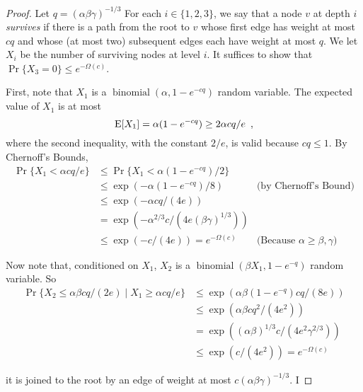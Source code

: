 \documentclass{patmorin}
\DeclareMathOperator{\binomial}{binomial}
\begin{document}
\begin{proof}
   Let $q=(\alpha\beta\gamma)^{-1/3}$
   For each $i\in\{1,2,3\}$, we say that a node $v$ at depth $i$
   \emph{survives} if there is a path from the root to $v$ whose
   first edge has weight at most $cq$
   and whose (at most two) subsequent edges each have weight at
   most $q$.  We let $X_i$ be the number of
   surviving nodes at level $i$.  It suffices to show that $\Pr\{X_3 =
   0\} \le e^{-\Omega(c)}$.

   First, note that $X_1$ is a $\binomial(\alpha, 1-e^{-cq})$ random variable.
   The expected value of $X_1$ is at most
   \[
       \mathrm{E}[X_1] = \alpha(1-e^{-cq}) \ge 2\alpha cq/e \enspace ,
   \]
   where the second inequality, with the constant $2/e$, is valid because
   $cq\le 1$.
   By Chernoff's Bounds,
   \begin{align*}
     \Pr\{X_1 < \alpha cq/e\} 
       & \le \Pr\{X_1 < \alpha(1-e^{-cq})/2\} \\
       & \le \exp\left(-\alpha(1-e^{-cq})/8\right) & \text{(by Chernoff's Bound)}\\
       & \le \exp\left(-\alpha cq/(4e)\right) & \text{}\\
       & = \exp\left(-\alpha^{2/3}c/\left(4e(\beta\gamma)^{1/3}\right)\right) \\
       & \le \exp\left(-c/(4e)\right) = e^{-\Omega(c)} & \text{(Because $\alpha \ge \beta,\gamma$)}
   \end{align*}

   Now note that, conditioned on $X_1$, $X_2$ is a
   $\binomial(\beta X_1,1-e^{-q})$ random variable.  So
   \begin{align*}
     \Pr\{X_2 \le \alpha\beta cq/(2e) \mid X_1 \ge \alpha cq/e\}
       & \le \exp\left(\alpha\beta (1-e^{-q}) cq/(8e)\right) \\
       & \le \exp\left(\alpha\beta cq^2/(4e^2)\right) \\
       & = \exp\left((\alpha\beta)^{1/3} c/(4e^2\gamma^{2/3})\right) \\
       & \le \exp\left(c/(4e^2)\right) = e^{-\Omega(c)}
   \end{align*}
 
it is joined to the
   root by an edge of weight at most $c(\alpha\beta\gamma)^{-1/3}$.
   I  


\end{proof}
\end{document}
